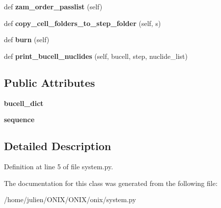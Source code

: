 \begin{DoxyCompactItemize}
def {\bfseries zam\+\_\+order\+\_\+passlist} (self)
\item 
\mbox{\label{classonix_1_1system_1_1System_a02c7b520de6ece5a20575c23554bd3e5}} 
def {\bfseries copy\+\_\+cell\+\_\+folders\+\_\+to\+\_\+step\+\_\+folder} (self, s)
\item 
\mbox{\label{classonix_1_1system_1_1System_ada1b4851dd9d417966118403e809d76e}} 
def {\bfseries burn} (self)
\item 
\mbox{\label{classonix_1_1system_1_1System_a5d07b15aaea5564a2521c51fdf3ec2b6}} 
def {\bfseries print\+\_\+bucell\+\_\+nuclides} (self, bucell, step, nuclide\+\_\+list)
\end{DoxyCompactItemize}
\subsection*{Public Attributes}
\begin{DoxyCompactItemize}
\item 
\mbox{\label{classonix_1_1system_1_1System_a43141b3c7778cf372d56e9f1b8a399d2}} 
{\bfseries bucell\+\_\+dict}
\item 
\mbox{\label{classonix_1_1system_1_1System_a8a10cdb422fcb846de25da8456d70fd5}} 
{\bfseries sequence}
\end{DoxyCompactItemize}


\subsection{Detailed Description}


Definition at line 5 of file system.\+py.



The documentation for this class was generated from the following file\+:\begin{DoxyCompactItemize}
\item 
/home/julien/\+O\+N\+I\+X/\+O\+N\+I\+X/onix/system.\+py\end{DoxyCompactItemize}
